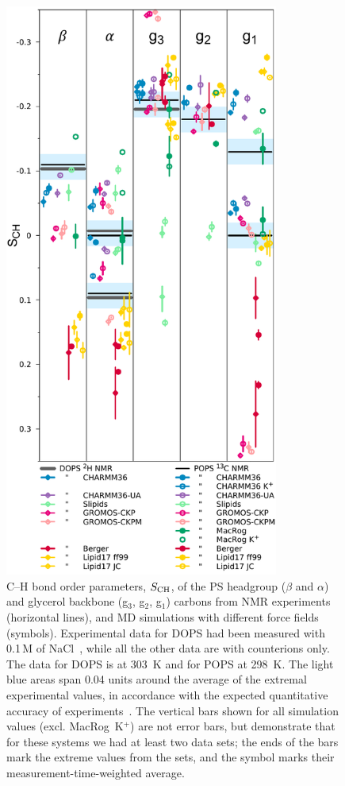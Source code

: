 \documentclass[journal=jpcbfk,manuscript=article]{achemso}
\begin{document}
\begin{figure}[]
  \centering
  \includegraphics[width=9.0cm]{../Figs/HGorderparametersPS.pdf}
  \caption{\label{HGorderParametersPS}
    C--H bond order parameters, $S_{\rm CH}$, of the PS headgroup ($\beta$ and $\alpha$) and
    glycerol backbone (g$_3$, g$_2$, g$_1$) carbons from NMR experiments (horizontal lines),
    and MD simulations with different force fields (symbols).
    Experimental data for DOPS had been measured with 0.1\,M of NaCl~\cite{browning80},
    while all the other data are with counterions only.
    The data for DOPS is at 303~K and for POPS at 298~K.
    The light blue areas span 0.04 units around the average of the extremal experimental values,
    in accordance with the expected quantitative accuracy of experiments~\cite{ollila16}.
    The vertical bars shown for all simulation values (excl. MacRog~K$^+$)
    are not error bars, but demonstrate that for these systems
    we had at least two data sets; the ends of the bars mark the extreme values
    from the sets, and the symbol marks their measurement-time-weighted average.
  }
\end{figure}
\end{document}
